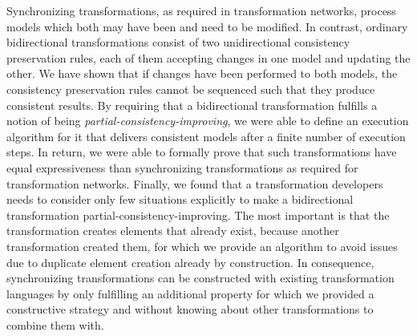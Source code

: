 \begin{insight}[Synchronization]
    Synchronizing transformations, as required in transformation networks, process models which both may have been and need to be modified.
    In contrast, ordinary bidirectional transformations consist of two unidirectional consistency preservation rules, each of them accepting changes in one model and updating the other.
    We have shown that if changes have been performed to both models, the consistency preservation rules cannot be sequenced such that they produce consistent results.
    By requiring that a bidirectional transformation fulfills a notion of being \emph{partial-consistency-improving}, we were able to define an execution algorithm for it that delivers consistent models after a finite number of execution steps.
    In return, we were able to formally prove that such transformations have equal expressiveness than synchronizing transformations as required for transformation networks. %
    Finally, we found that a transformation developers needs to consider only few situations explicitly to make a bidirectional transformation partial-consistency-improving. 
    The most important is that the transformation creates elements that already exist, because another transformation created them, for which we provide an algorithm to avoid issues due to duplicate element creation already by construction.
    In consequence, synchronizing transformations can be constructed with existing transformation languages by only fulfilling an additional property for which we provided a constructive strategy and without knowing about other transformations to combine them with.
\end{insight}

